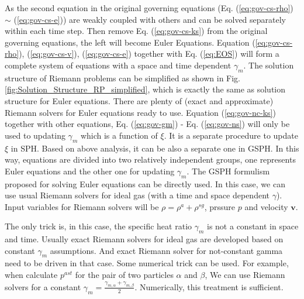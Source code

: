 As the second equation in the original governing equations (Eq. (\ref{eq:gov-cs-rho}) $\sim$ (\ref{eq:gov-cs-e})) are weakly coupled with others and can be solved separately within each time step. Then remove Eq. (\ref{eq:gov-cs-ks}) from the original governing equations, the left will become Euler Equations. Equation (\ref{eq:gov-cs-rho}), (\ref{eq:gov-cs-v}), (\ref{eq:gov-cs-e}) together with Eq. (\ref{eq:EOS}) will form a complete system of equations with a space and time dependent $\gamma_{m}$. The solution structure of Riemann problems can be simplified as shown in Fig. \ref{fig:Solution_Structure_RP_simplified}, which is exactly the same as solution structure for Euler equations. There are plenty of (exact and approximate) Riemann solvers for Euler equations ready to use. Equation (\ref{eq:gov-nc-ks}) together with other equations, Eq. (\ref{eq:gov-gm}) - Eq. (\ref{eq:gov-ns}) will only be used to updating $\gamma_{m}$ which is a function of $\xi$. It is a separate procedure to update $\xi$ in SPH. Based on above analysis, it can be also a separate one in GSPH. In this way, equations are divided into two relatively independent groups, one represents Euler equations and the other one for updating $\gamma_{m}$.
The GSPH formulism \citep{inutsuka2002reformulation} proposed for solving Euler equations can be directly used. In this case, we can use usual Riemann solvers for ideal gas (with a time and space dependent $\gamma$). Input variables for Riemann solvers will be $\rho=\rho^a + \rho^{sg}$, prssure $p$ and velocity $\textbf{v}$.
 
The only trick is, in this case, the specific heat ratio $\gamma_{m}$ is not a constant in space and time. Usually exact Riemann solvers for ideal gas are developed based on constant $\gamma_{m}$ assumptions. And exact Riemann solver for not-constant gamma need to be driven in that case. Some numerical trick can be used. For example, when calculate $p^{ast}$ for the pair of two particles $\alpha$ and $\beta$, We can use Riemann solvers for a constant $\gamma_{m}=\frac{\gamma_{m,\alpha}+\gamma_{m,\beta}}{2}$.
Numerically, this treatment is sufficient. 
